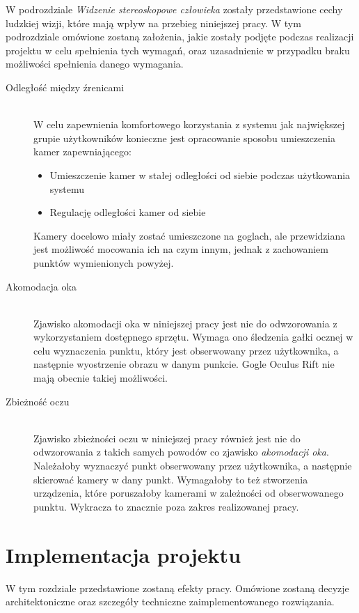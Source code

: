 \documentclass[a4paper,11pt,twoside]{report}
\theoremstyle{definition}
\begin{document}
W podrozdziale \textit{Widzenie stereoskopowe człowieka} zostały przedstawione cechy ludzkiej wizji, które mają wpływ na przebieg niniejszej pracy. W tym podrozdziale omówione zostaną założenia, jakie zostały podjęte podczas realizacji projektu w celu spełnienia tych wymagań, oraz uzasadnienie w przypadku braku możliwości spełnienia danego wymagania.

\begin{description}

\item[Odległość między źrenicami] \hfill \\
W celu zapewnienia komfortowego korzystania z systemu jak największej grupie użytkowników konieczne jest opracowanie sposobu umieszczenia kamer zapewniającego:
\begin{itemize}
\item Umieszczenie kamer w stałej odległości od siebie podczas użytkowania systemu
\item Regulację odległości kamer od siebie
\end{itemize}

Kamery docelowo miały zostać umieszczone na goglach, ale przewidziana jest możliwość mocowania ich na czym innym, jednak z zachowaniem punktów wymienionych powyżej.

\item [Akomodacja oka] \hfill \\
Zjawisko akomodacji oka w niniejszej pracy jest nie do odwzorowania z wykorzystaniem dostępnego sprzętu. Wymaga ono śledzenia gałki ocznej w celu wyznaczenia punktu, który jest obserwowany przez użytkownika, a następnie wyostrzenie obrazu w danym punkcie. Gogle Oculus Rift nie mają obecnie takiej możliwości.

\item[Zbieżność oczu] \hfill \\
Zjawisko zbieżności oczu w niniejszej pracy również jest nie do odwzorowania z takich samych powodów co zjawisko \textit{akomodacji oka}. Należałoby wyznaczyć punkt obserwowany przez użytkownika, a następnie skierować kamery w dany punkt. Wymagałoby to też stworzenia urządzenia, które poruszałoby kamerami w zależności od obserwowanego punktu. Wykracza to znacznie poza zakres realizowanej pracy.

\end{description}

\chapter{Implementacja projektu}
W tym rozdziale przedstawione zostaną efekty pracy. Omówione zostaną decyzje architektoniczne oraz szczegóły techniczne zaimplementowanego rozwiązania.
\end{document}

